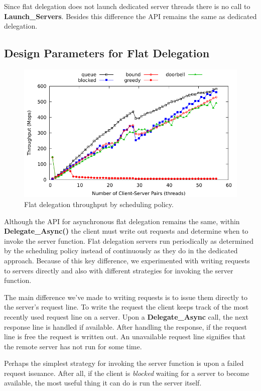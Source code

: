 \documentclass{uicthesi}
\begin{document}
Since flat delegation does not launch dedicated server threads there is no call to \textbf{Launch\_Servers}. Besides this difference the API remains the same as dedicated delegation. 

\subsection{Design Parameters for Flat Delegation}  

\begin{figure}[ht!]
\centering
\includegraphics[width=0.9\columnwidth]{FIG/flat_delegation_strategy.pdf}
\caption{Flat delegation throughput by scheduling policy.}
\label{fig:flat_delegation_strategy}
\end{figure}

Although the API for asynchronous flat delegation remains the same, within \textbf{Delegate\_Async()} the client must write out requests and determine when to invoke the server function. Flat delegation servers run periodically as determined by the scheduling policy instead of continuously as they do in the dedicated approach. Because of this key difference, we experimented with writing requests to servers directly and also with different strategies for invoking the server function. 

The main difference we've made to writing requests is to issue them directly to the server's request line. To write the request the client keeps track of the most recently used request line on a server. Upon a \textbf{Delegate\_Async} call, the next response line is handled if available. After handling the response, if the request line is free the request is written out. An unavailable request line signifies that the remote server has not run for some time. 

Perhaps the simplest strategy for invoking the server function is upon a failed request issuance. After all, if the client is \textit{blocked} waiting for a server to become available, the most useful thing it can do is run the server itself. 
\end{document}
